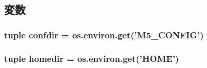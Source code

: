 \subsection{変数}
\hypertarget{namespacem5_1_1config_a15fead5ae2852fe545b5fd29acacdf18}{
\subsubsection[{confdir}]{\setlength{\rightskip}{0pt plus 5cm}tuple {\bf confdir} = os.environ.get('M5\_\-CONFIG')}}
\label{namespacem5_1_1config_a15fead5ae2852fe545b5fd29acacdf18}
\hypertarget{namespacem5_1_1config_a693a958b11073f99532d303cd5f1ab62}{
\subsubsection[{homedir}]{\setlength{\rightskip}{0pt plus 5cm}tuple {\bf homedir} = os.environ.get('HOME')}}
\label{namespacem5_1_1config_a693a958b11073f99532d303cd5f1ab62}
